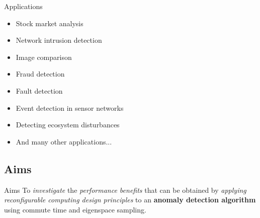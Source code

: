 \begin{frame}{Applications}
    \begin{itemize}
        \item Stock market analysis

        \smallskip
        \item Network intrusion detection

        \smallskip
        \item Image comparison

        \smallskip
        \item Fraud detection

        \smallskip
        \item Fault detection

        \smallskip
        \item Event detection in sensor networks

        \smallskip
        \item Detecting ecosystem disturbances

        \smallskip
        \item And many other applications...
    \end{itemize}
\end{frame}

\subsection{Aims}
\begin{frame}{Aims}\relax
    {\huge To \emph{investigate} the \emph{performance benefits} that can be
        obtained by \emph{applying} \emph{reconfigurable computing design
        principles} to an \textbf{anomaly detection algorithm} using commute
        time and eigenspace sampling.}

\end{frame}

